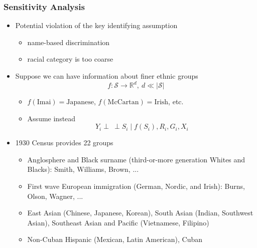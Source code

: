 \documentclass{beamer}
\newcommand{\indep}{\mathbin{\perp\!\!\!\!\!\:\perp}}
\newcommand{\R}{\ensuremath{\mathbb{R}}}
\newcommand{\cS}{\mathcal{S}}
\begin{document}
\begin{frame}

  \frametitle{Sensitivity Analysis}

  \begin{itemize}
  \item Potential violation of the key identifying assumption
    \begin{itemize}
    \item name-based discrimination
    \item racial category is too coarse
    \end{itemize}

  \item Suppose we can have information about finer ethnic groups
    $$f:\cS\to\R^d,\  d\ll|\cS|$$
    \begin{itemize}
    \item $f(\text{Imai}) = \text{Japanese}$,  $f(\text{McCartan}) =
      \text{Irish}$, etc.
    \item Assume instead
      $$Y_i\indep S_i\mid f(S_i),R_i,G_i,X_i$$
    \end{itemize}

  \item 1930 Census provides 22 groups
    \begin{itemize}
    \item Anglosphere and Black surname (third-or-more generation
      Whites and Blacks): Smith, Williams, Brown,
      ...
    \item First wave European immigration (German, Nordic, and Irish): Burns, Olson, Wagner, ...
    \item East Asian (Chinese, Japanese, Korean), South Asian
      (Indian, Southwest Asian),
      Southeast Asian and Pacific (Vietnamese, Filipino)
    \item Non-Cuban Hispanic (Mexican, Latin American), Cuban 
    \end{itemize}
 \end{itemize}


\end{frame}
\end{document}
